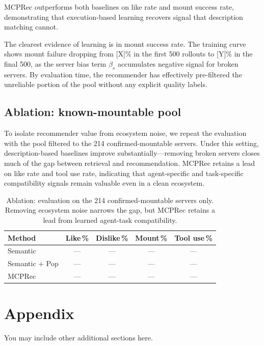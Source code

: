 \documentclass{article} %
\begin{document}
MCPRec outperforms both baselines on like rate and mount success rate, demonstrating that execution-based learning recovers signal that description matching cannot. %

The clearest evidence of learning is in mount success rate. The training curve shows mount failure dropping from [X]\% in the first 500 rollouts to [Y]\% in the final 500, as the server bias term $\beta_s$ accumulates negative signal for broken servers. By evaluation time, the recommender has effectively pre-filtered the unreliable portion of the pool without any explicit quality labels.

\subsection{Ablation: known-mountable pool}
\label{sec:ablation}

To isolate recommender value from ecosystem noise, we repeat the evaluation with the pool filtered to the 214 confirmed-mountable servers. Under this setting, description-based baselines improve substantially---removing broken servers closes much of the gap between retrieval and recommendation. MCPRec retains a lead on like rate and tool use rate, indicating that agent-specific and task-specific compatibility signals remain valuable even in a clean ecosystem.

\begin{table}[t]
\begin{center}
\begin{tabular}{lcccc}
\toprule
\textbf{Method} & \textbf{Like\,\%} & \textbf{Dislike\,\%} & \textbf{Mount\,\%} & \textbf{Tool use\,\%} \\
\midrule
Semantic & --- & --- & --- & --- \\
Semantic + Pop & --- & --- & --- & --- \\
MCPRec & --- & --- & --- & --- \\
\bottomrule
\end{tabular}
\end{center}
\caption{Ablation: evaluation on the 214 confirmed-mountable servers only. Removing ecosystem noise narrows the gap, but MCPRec retains a lead from learned agent-task compatibility.}
\label{tab:ablation}
\end{table}




\appendix
\section{Appendix}
You may include other additional sections here.
\end{document}
